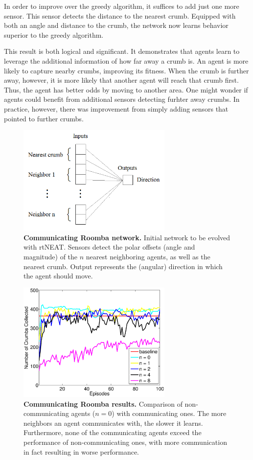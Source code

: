 \documentclass[conference]{IEEEtran}
\begin{document}
In order to improve over the greedy algorithm, it suffices to add just one more sensor. This sensor detects the distance to the nearest crumb. Equipped with both an angle and distance to the crumb, the network now learns behavior superior to the greedy algorithm.

This result is both logical and significant. It demonstrates that agents learn to leverage the additional information of how far away a crumb is. An agent is more likely to capture nearby crumbs, improving its fitness. When the crumb is further away, however, it is more likely that another agent will reach that crumb first. Thus, the agent has better odds by moving to another area. 
One might wonder if agents could benefit from additional sensors detecting furhter away crumbs. In practice, however, there was improvement from simply adding sensors that pointed to further crumbs.

\begin{figure}[t]
\centering
\includegraphics[width=3.0in]{./figures/neroevolution/comm_network.png}
\caption{\textbf{Communicating Roomba network.} Initial network to be evolved with rtNEAT. Sensors detect the polar offsets (angle and magnitude) of the $n$ nearest neighboring agents, as well as the nearest crumb. Output represents the (angular) direction in which the agent should move.}
\label{neroevolution:communication}
\end{figure}

\begin{figure}[t]
\centering
\includegraphics[width=3.0in]{./figures/neroevolution/comm_result.eps}
\caption{\textbf{Communicating Roomba results.} Comparison of non-communicating agents ($n=0$) with communicating ones. The more neighbors an agent communicates with, the slower it learns. Furthermore, none of the communicating agents exceed the performance of non-communicating ones, with more communication in fact resulting in worse performance. }
\label{neroevolution:communication_results}
\end{figure}
\end{document}
